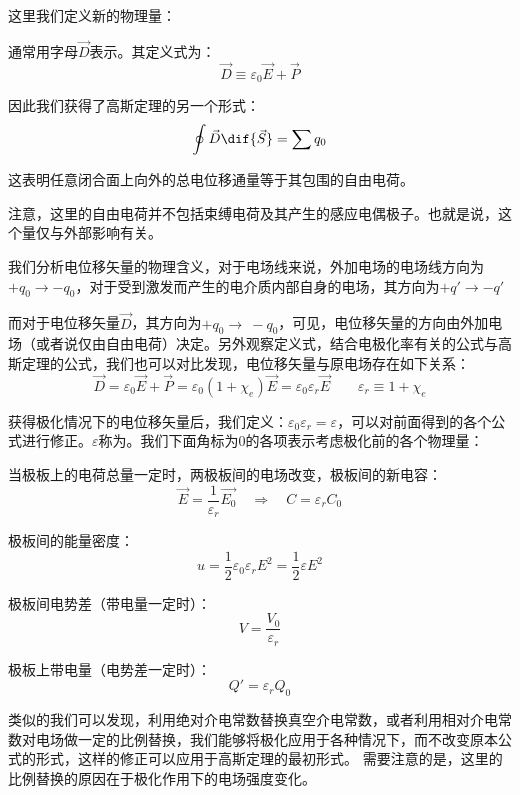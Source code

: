 这里我们定义新的物理量：
\begin{law}
    通常用字母$\vec{D}$表示。其定义式为：
    \[\vec{D}\equiv\varepsilon_0\vec{E}+\vec{P}\]

    因此我们获得了高斯定理的另一个形式：
    \[\oint\vec{D}\dif{\vec{S}}=\sum q_0\]

    这表明任意闭合面上向外的总电位移通量等于其包围的自由电荷。
\end{law}

注意，这里的自由电荷并不包括束缚电荷及其产生的感应电偶极子。也就是说，这个量仅与外部影响有关。

我们分析电位移矢量的物理含义，对于电场线来说，外加电场的电场线方向为$+q_0\rightarrow -q_0$，对于受到激发而产生的电介质内部自身的电场，其方向为$+q'\rightarrow -q'$

而对于电位移矢量$\vec{D}$，其方向为$+q_0\rightarrow\ -q_0$，可见，电位移矢量的方向由外加电场（或者说仅由自由电荷）决定。另外观察定义式，结合电极化率有关的公式与高斯定理的公式，我们也可以对比发现，电位移矢量与原电场存在如下关系：
\[\vec{D}=\varepsilon_0\vec{E}+\vec{P}=\varepsilon_0(1+\chi_e)\vec{E}=\varepsilon_0\varepsilon_r\vec{E}\qquad\varepsilon_r\equiv1+\chi_e\]

获得极化情况下的电位移矢量后，我们定义：$\varepsilon_0\varepsilon_r = \varepsilon$，可以对前面得到的各个公式进行修正。$\varepsilon$称为。我们下面角标为0的各项表示考虑极化前的各个物理量：
\begin{Itemize}
    \item 当极板上的电荷总量一定时，两极板间的电场改变，极板间的新电容：
    \[\vec{E}=\dfrac{1}{\varepsilon_r}\vec{E_0}\quad\Rightarrow\quad C=\varepsilon_r C_0\]
    \item 极板间的能量密度：
    \[u=\dfrac{1}{2}\varepsilon_0\varepsilon_r E^2=\dfrac{1}{2}\varepsilon E^2\]
    \item 极板间电势差（带电量一定时）：
    \[V = \dfrac{V_0}{\varepsilon_r}\]
    \item 极板上带电量（电势差一定时）：
    \[Q'= \varepsilon_r Q_0\]
\end{Itemize}

类似的我们可以发现，利用绝对介电常数替换真空介电常数，或者利用相对介电常数对电场做一定的比例替换，我们能够将极化应用于各种情况下，而不改变原本公式的形式，这样的修正可以应用于高斯定理的最初形式。
需要注意的是，这里的比例替换的原因在于极化作用下的电场强度变化。

